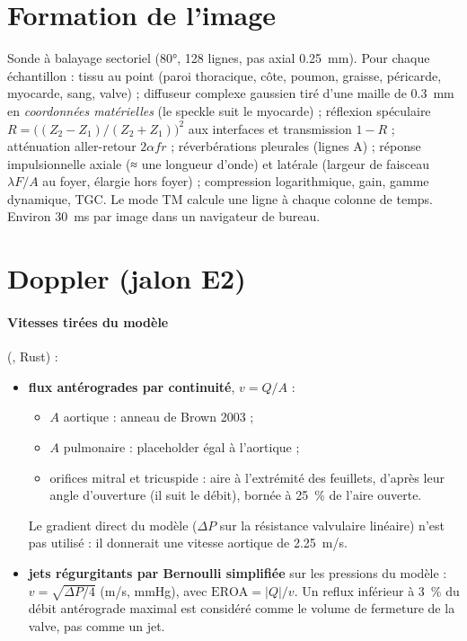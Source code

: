 \documentclass[10pt,a4paper]{article}
\newcommand{\vp}[1]{\texttt{\detokenize{#1}}}
\begin{document}
\section{Formation de l'image}
Sonde à balayage sectoriel (\ang{80}, 128 lignes, pas axial \SI{0,25}{mm}). Pour chaque échantillon : tissu au point
(paroi thoracique, côte, poumon, graisse, péricarde, myocarde, sang, valve) ; diffuseur complexe gaussien tiré d'une
maille de \SI{0,3}{mm} en \emph{coordonnées matérielles} (le speckle suit le myocarde) ; réflexion spéculaire
$R=\bigl((Z_2-Z_1)/(Z_2+Z_1)\bigr)^2$ aux interfaces et transmission $1-R$ ; atténuation aller-retour $2\alpha f r$ ;
réverbérations pleurales (lignes A) ; réponse impulsionnelle axiale (≈ une longueur d'onde) et latérale (largeur de
faisceau $\lambda F/A$ au foyer, élargie hors foyer) ; compression logarithmique, gain, gamme dynamique, TGC. Le mode TM
calcule une ligne à chaque colonne de temps. Environ \SI{30}{ms} par image dans un navigateur de bureau.

\section{Doppler (jalon E2)}
\paragraph{Vitesses tirées du modèle} (\vp{doppler_series}, Rust) :
\begin{itemize}
\item \textbf{flux antérogrades par continuité}, $v=Q/A$ :
  \begin{itemize}
  \item $A$ aortique : anneau de Brown 2003 ;
  \item $A$ pulmonaire : placeholder égal à l'aortique ;
  \item orifices mitral et tricuspide : aire à l'extrémité des feuillets, d'après leur angle d'ouverture (il suit le débit), bornée à 25~\% de l'aire ouverte.
  \end{itemize}
  Le gradient direct du modèle ($\Delta P$ sur la résistance valvulaire linéaire) n'est pas utilisé : il donnerait une vitesse aortique de \SI{2,25}{m/s}.
\item \textbf{jets régurgitants par Bernoulli simplifiée} sur les pressions du modèle :
  $v=\sqrt{\Delta P/4}$ (m/s, mmHg), avec $\mathrm{EROA}=|Q|/v$. Un reflux inférieur à 3~\% du débit antérograde maximal
  est considéré comme le volume de fermeture de la valve, pas comme un jet.
\end{itemize}
\end{document}
